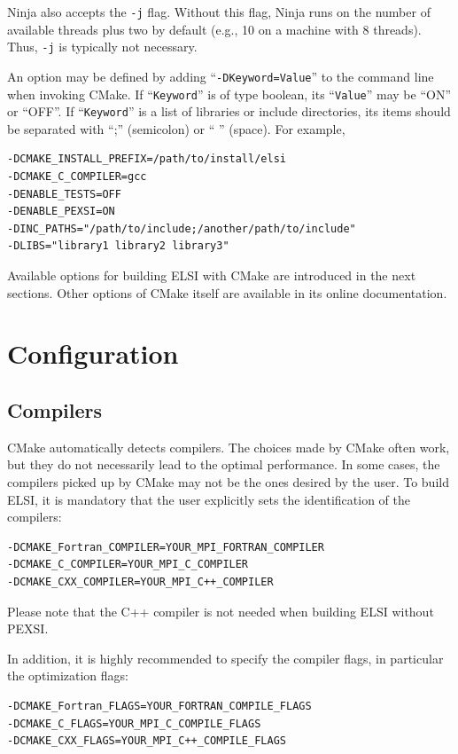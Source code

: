 \documentclass{report}
\begin{document}
Ninja also accepts the \verb+-j+ flag. Without this flag, Ninja runs on the number of available threads plus two by default (e.g., 10 on a machine with 8 threads). Thus, \verb+-j+ is typically not necessary.

An option may be defined by adding ``\verb+-DKeyword=Value+'' to the command line when invoking CMake. If ``\verb+Keyword+'' is of type boolean, its ``\verb+Value+'' may be ``ON'' or ``OFF''. If ``\verb+Keyword+'' is a list of libraries or include directories, its items should be separated with ``;'' (semicolon) or `` '' (space). For example,
\begin{tcolorbox}
\begin{verbatim}
-DCMAKE_INSTALL_PREFIX=/path/to/install/elsi
-DCMAKE_C_COMPILER=gcc
-DENABLE_TESTS=OFF
-DENABLE_PEXSI=ON
-DINC_PATHS="/path/to/include;/another/path/to/include"
-DLIBS="library1 library2 library3"
\end{verbatim}
\end{tcolorbox}

Available options for building ELSI with CMake are introduced in the next sections. Other options of CMake itself are available in its online documentation.

\section{Configuration}
\label{sec:config}
\subsection{Compilers}
\label{subsec:config_compilers}
CMake automatically detects compilers. The choices made by CMake often work, but they do not necessarily lead to the optimal performance. In some cases, the compilers picked up by CMake may not be the ones desired by the user. To build ELSI, it is mandatory that the user explicitly sets the identification of the compilers:
\begin{tcolorbox}
\begin{verbatim}
-DCMAKE_Fortran_COMPILER=YOUR_MPI_FORTRAN_COMPILER
-DCMAKE_C_COMPILER=YOUR_MPI_C_COMPILER
-DCMAKE_CXX_COMPILER=YOUR_MPI_C++_COMPILER
\end{verbatim}
\end{tcolorbox}

Please note that the C++ compiler is not needed when building ELSI without PEXSI.

In addition, it is highly recommended to specify the compiler flags, in particular the optimization flags:
\begin{tcolorbox}
\begin{verbatim}
-DCMAKE_Fortran_FLAGS=YOUR_FORTRAN_COMPILE_FLAGS
-DCMAKE_C_FLAGS=YOUR_MPI_C_COMPILE_FLAGS
-DCMAKE_CXX_FLAGS=YOUR_MPI_C++_COMPILE_FLAGS
\end{verbatim}
\end{tcolorbox}
\end{document}
